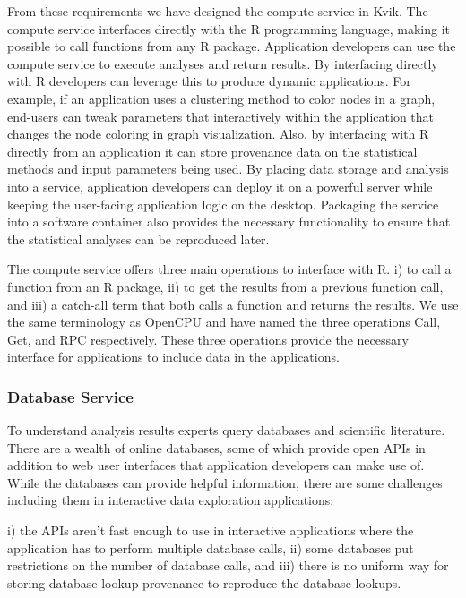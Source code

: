 From these requirements we have designed the compute service in Kvik. The compute
service interfaces directly with the R programming language, making it possible
to call functions from any R package. Application developers can use the
compute service to execute analyses and return results. By interfacing directly
with R developers can leverage this to produce dynamic applications. For example,
if an application uses a clustering method to color nodes in a graph, end-users
can tweak parameters that interactively within the application that changes the
node coloring in graph visualization. Also, by interfacing with R directly from
an application it can store provenance data on the statistical methods and input
parameters being used. 
By placing data storage and analysis into a service, application developers can
deploy it on a powerful server while keeping the user-facing application logic
on the desktop. Packaging the service into a software container also
provides the necessary functionality to ensure that the statistical analyses can
be reproduced later. 

The compute service offers three main operations to interface with R. 
i) to call a function from an R package,
ii) to get the results from a previous function call,
and iii) a catch-all term that both calls a function and returns the results. 
We use the same terminology as OpenCPU\cite{opencpu} and have named the three
operations Call, Get, and RPC respectively. These three operations provide the
necessary interface for applications to include data in the applications.

\subsubsection*{Database Service} 
To understand analysis results experts query databases and scientific
literature. There are a wealth of online databases, some of which provide open
APIs in addition to web user interfaces that application developers can make use
of. While the databases can provide helpful information, there are some
challenges including them in interactive data exploration applications: 

i) the APIs aren't fast enough to use in interactive applications where the
application has to perform multiple database calls, 
ii) some databases put restrictions on the number of database calls, and 
iii) there is no uniform way for storing database lookup provenance to reproduce
the database lookups. 

